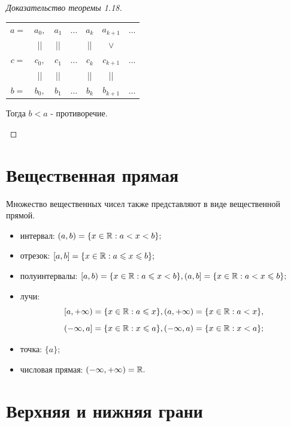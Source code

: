 \begin{proof}[Доказательство теоремы 1.18]
\begin{enumerate}
			\begin{center}
				\begin{tabular}{ccccccc}
					$a =$ & $a_0,$ & $a_1$ & $\dots$ & $a_k$ & $a_{k + 1}$ & $\dots$ \\
					& || & || & & || & $\vee$ & \\
					$c =$ & $c_0,$ & $c_1$ & $\dots$ & $c_k$ & $c_{k + 1}$ & $\dots$ \\
					& || & || & & || & || & \\
					$b =$ & $b_0,$ & $b_1$ & $\dots$ & $b_k$ & $b_{k + 1}$ & $\dots$ \\
				\end{tabular}
			\end{center}
			
			Тогда $b < a$ - противоречие.	
		\end{enumerate}
	\end{proof}
	
	\section{Вещественная прямая}
	
	Множество вещественных чисел также представляют в виде вещественной прямой.
	
	\begin{definition}
		\begin{itemize}
			\item интервал: $(a, b) = \{x \in \mathbb R : a < x < b\};$
			\item отрезок: $[a, b] = \{x \in \mathbb R : a \leqslant x \leqslant b\};$
			\item полуинтервалы: $[a, b) = \{x \in \mathbb R : a \leqslant x < b\}, (a, b] = \{x \in \mathbb R : a < x \leqslant b\};$
			\item лучи:
			\[ [a, +\infty) = \{x \in \mathbb R : a \leqslant x\}, (a, +\infty) = \{x \in \mathbb R : a < x\}, \]
			\[ (-\infty, a] = \{x \in \mathbb R : x \leqslant a\}, (-\infty, a) = \{x \in \mathbb R : x < a\}; \]
			\item точка: $\{a\};$
			\item числовая прямая: $(-\infty, +\infty) = \mathbb R.$
		\end{itemize}
	\end{definition}
	
	\section{Верхняя и нижняя грани}
	
